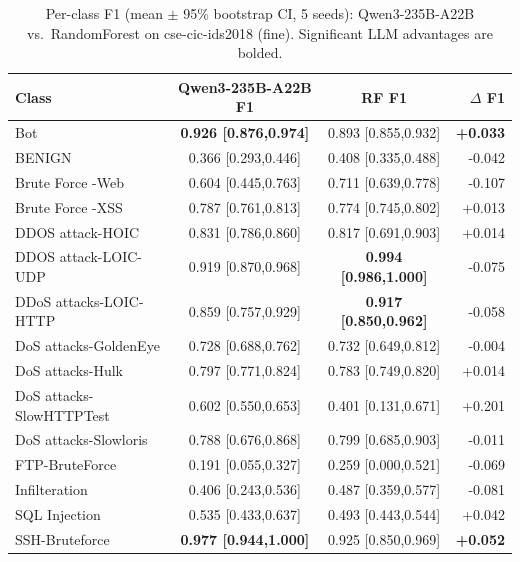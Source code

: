 \begin{table}[t]
\caption{Per-class F1 (mean $\pm$ 95\% bootstrap CI, 5 seeds): Qwen3-235B-A22B vs.\ RandomForest on cse-cic-ids2018 (fine). Significant LLM advantages are bolded.}
\label{t:r2_perclass}
\begin{tabular}{lccr}
\hline
Class & Qwen3-235B-A22B F1 & RF F1 & $\Delta$ F1 \\
\hline
Bot & \textbf{0.926 [0.876,0.974]} & 0.893 [0.855,0.932] & \textbf{+0.033} \\
BENIGN & 0.366 [0.293,0.446] & 0.408 [0.335,0.488] & -0.042 \\
Brute Force -Web & 0.604 [0.445,0.763] & 0.711 [0.639,0.778] & -0.107 \\
Brute Force -XSS & 0.787 [0.761,0.813] & 0.774 [0.745,0.802] & +0.013 \\
DDOS attack-HOIC & 0.831 [0.786,0.860] & 0.817 [0.691,0.903] & +0.014 \\
DDOS attack-LOIC-UDP & 0.919 [0.870,0.968] & \textbf{0.994 [0.986,1.000]} & -0.075 \\
DDoS attacks-LOIC-HTTP & 0.859 [0.757,0.929] & \textbf{0.917 [0.850,0.962]} & -0.058 \\
DoS attacks-GoldenEye & 0.728 [0.688,0.762] & 0.732 [0.649,0.812] & -0.004 \\
DoS attacks-Hulk & 0.797 [0.771,0.824] & 0.783 [0.749,0.820] & +0.014 \\
DoS attacks-SlowHTTPTest & 0.602 [0.550,0.653] & 0.401 [0.131,0.671] & +0.201 \\
DoS attacks-Slowloris & 0.788 [0.676,0.868] & 0.799 [0.685,0.903] & -0.011 \\
FTP-BruteForce & 0.191 [0.055,0.327] & 0.259 [0.000,0.521] & -0.069 \\
Infilteration & 0.406 [0.243,0.536] & 0.487 [0.359,0.577] & -0.081 \\
SQL Injection & 0.535 [0.433,0.637] & 0.493 [0.443,0.544] & +0.042 \\
SSH-Bruteforce & \textbf{0.977 [0.944,1.000]} & 0.925 [0.850,0.969] & \textbf{+0.052} \\
\hline
\end{tabular}
\end{table}